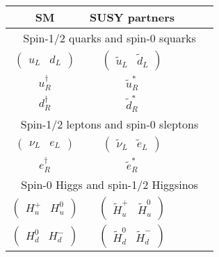 \begin{table}[!htb]
	\centering
	\begin{tabular}{c|c}
		\hline
		\cline{2-3}
									 \Gls{SM} 										& \Gls{SUSY} partners															 \\
		\hline\hline
		\multicolumn{5}{c}{Spin-1/2 quarks and spin-0 squarks} \\
		\hline
		$\begin{pmatrix} u_L&d_L\end{pmatrix}$		& $\begin{pmatrix} \tilde{u}_L&\tilde{d}_L\end{pmatrix}$					\\ %
		 $u^{\dagger}_R$								& $\tilde{u}^*_R$														& \\
		 $d^{\dagger}_R$								& $\tilde{d}^*_R$														& \\
		\hline\hline
		\multicolumn{5}{c}{Spin-1/2 leptons and spin-0 sleptons} \\
		\hline
		$\begin{pmatrix} \nu_L&e_L\end{pmatrix}$		& $\begin{pmatrix} \tilde{\nu}_L&\tilde{e}_L\end{pmatrix}$				\\	%
		$e^{\dagger}_R$								& $\tilde{e}^*_R$														\\%
		\hline\hline
		\multicolumn{5}{c}{Spin-0 Higgs and spin-1/2 Higgsinos} \\
		\hline
		$\begin{pmatrix} H_u^+&H_u^0\end{pmatrix}$	& $\begin{pmatrix} \widetilde{H}_u^+&\widetilde{H}_u^0\end{pmatrix}$		\\%
		$\begin{pmatrix} H_d^0&H_d^-\end{pmatrix}$	& $\begin{pmatrix} \widetilde{H}_d^0&\widetilde{H}_d^-\end{pmatrix}$		\\%

\end{tabular}
\end{table}
